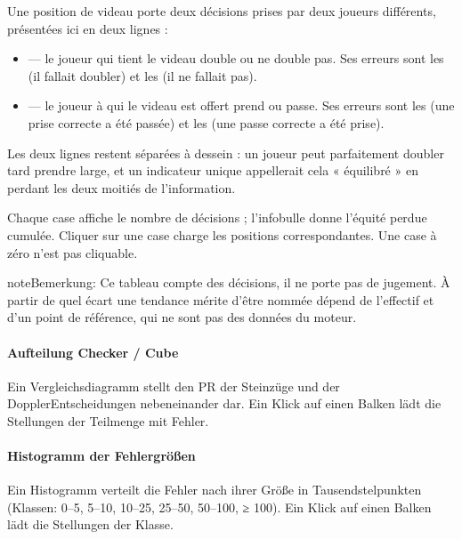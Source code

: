 \documentclass[letterpaper,10pt,german]{sphinxmanual}
\begin{document}
\sphinxAtStartPar
Une position de videau porte deux décisions prises par deux joueurs
différents, présentées ici en deux lignes :
\begin{itemize}
\item {} 
\sphinxAtStartPar
{} — le joueur qui tient le videau double ou ne double pas. Ses
erreurs sont les  (il fallait doubler) et les  (il ne fallait pas).

\item {} 
\sphinxAtStartPar
{} — le joueur à qui le videau est offert prend ou passe. Ses
erreurs sont les  (une prise correcte a été passée) et les
 (une passe correcte a été prise).

\end{itemize}

\sphinxAtStartPar
Les deux lignes restent séparées à dessein : un joueur peut parfaitement
doubler tard  prendre large, et un indicateur unique appellerait cela
« équilibré » en perdant les deux moitiés de l’information.

\sphinxAtStartPar
Chaque case affiche le nombre de décisions ; l’infobulle donne l’équité perdue
cumulée. Cliquer sur une case charge les positions correspondantes. Une case à
zéro n’est pas cliquable.

\begin{sphinxadmonition}{note}{Bemerkung:}
\sphinxAtStartPar
Ce tableau compte des décisions, il ne porte pas de jugement. À partir de
quel écart une tendance mérite d’être nommée dépend de l’effectif et d’un
point de référence, qui ne sont pas des données du moteur.
\end{sphinxadmonition}


\paragraph{Aufteilung Checker / Cube}
\label{\detokenize{manuel:repartition-checker-cube}}
\sphinxAtStartPar
Ein Vergleichsdiagramm stellt den PR der Steinzüge und der Doppler\sphinxhyphen{}Entscheidungen nebeneinander dar. Ein Klick auf einen Balken lädt die Stellungen der Teilmenge mit Fehler.


\paragraph{Histogramm der Fehlergrößen}
\label{\detokenize{manuel:histogramme-des-magnitudes-d-erreur}}
\sphinxAtStartPar
Ein Histogramm verteilt die Fehler nach ihrer Größe in Tausendstelpunkten (Klassen: 0–5, 5–10, 10–25, 25–50, 50–100, ≥ 100). Ein Klick auf einen Balken lädt die Stellungen der Klasse.
\end{document}
